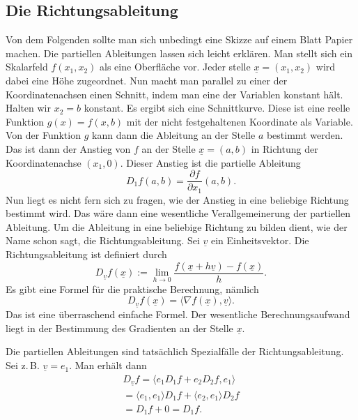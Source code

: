 \documentclass[a4paper,10pt,fleqn,twocolumn,twoside]{article}
\numberwithin{equation}{section}
\begin{document}
\subsection{Die Richtungsableitung}

Von dem Folgenden sollte man sich unbedingt eine Skizze auf einem
Blatt Papier machen. Die partiellen Ableitungen lassen sich leicht
erklären. Man stellt sich ein Skalarfeld $f(x_1,x_2)$ als eine
Oberfläche vor. Jeder stelle $\underline x=(x_1,x_2)$ wird dabei
eine Höhe zugeordnet. Nun macht man parallel zu einer der
Koordinatenachsen einen Schnitt, indem man eine der Variablen
konstant hält. Halten wir $x_2=b$ konstant. Es ergibt sich
eine Schnittkurve. Diese ist eine reelle Funktion $g(x)=f(x,b)$
mit der nicht festgehaltenen Koordinate als Variable.
Von der Funktion $g$ kann dann die Ableitung an der Stelle $a$
bestimmt werden. Das ist dann der Anstieg von $f$ an der Stelle
$\underline x=(a,b)$ in Richtung der Koordinatenachse $(x_1,0)$.
Dieser Anstieg ist die partielle Ableitung
\begin{equation}
D_1 f(a,b) = \frac{\partial f}{\partial x_1}(a,b).
\end{equation}
%
Nun liegt es nicht fern sich zu fragen, wie der Anstieg in eine
beliebige Richtung bestimmt wird. Das wäre dann eine wesentliche
Verallgemeinerung der partiellen Ableitung.
%
Um die Ableitung in eine beliebige Richtung zu bilden dient, wie der
Name schon sagt, die Richtungsableitung. Sei $\underline v$
ein Einheitsvektor. Die Richtungsableitung ist definiert durch
\begin{equation}
D_{\underline v} f(\underline x) := \lim_{h\rightarrow 0}
\frac{f(\underline x+h\underline v)-f(\underline x)}{h}.
\end{equation}
Es gibt eine Formel für die praktische Berechnung, nämlich
\begin{equation}
D_{\underline v} f(\underline x)
= \langle\nabla f(\underline x),\underline v\rangle.
\end{equation}
Das ist eine überraschend einfache Formel. Der wesentliche
Berechnungsaufwand liegt in der Bestimmung des Gradienten
an der Stelle $\underline x$.

Die partiellen Ableitungen sind tatsächlich Spezialfälle der
Richtungsableitung. Sei z.\,B. $\underline v=e_1$. Man erhält dann
\begin{gather*}
D_{\underline v} f
= \langle e_1 D_1f+e_2 D_2 f, e_1\rangle\\
= \langle e_1, e_1\rangle D_1f  + \langle e_2, e_1\rangle D_2 f\\
= D_1f+0 = D_1f.
\end{gather*}
\end{document}
